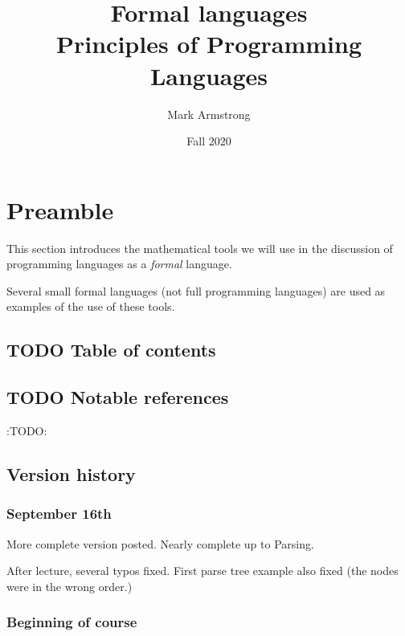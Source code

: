 \documentclass[11pt]{article}
\author{Mark Armstrong}
\date{Fall 2020}
\title{Formal languages\\\medskip
\large Principles of Programming Languages}
\theoremstyle{definition}
\begin{document}
\maketitle

\section{Preamble}
\label{sec:org66eb559}

This section introduces the mathematical tools
we will use in the discussion of programming languages
as a \emph{formal} language.

Several small formal languages (not full programming languages)
are used as examples of the use of these tools.

\subsection{{\bfseries\sffamily TODO} Table of contents}
\label{sec:org6337310}

\begin{scriptsize}

\end{scriptsize}

\subsection{{\bfseries\sffamily TODO} Notable references}
\label{sec:org84ac58e}

:TODO:

\subsection{Version history}
\label{sec:orgd7b20e7}

\subsubsection{September 16th}
\label{sec:orgf5d81c0}

More complete version posted. Nearly complete up to Parsing.

After lecture, several typos fixed.
First parse tree example also fixed
(the nodes were in the wrong order.)

\subsubsection{Beginning of course}
\label{sec:org67b2edd}
\end{document}

